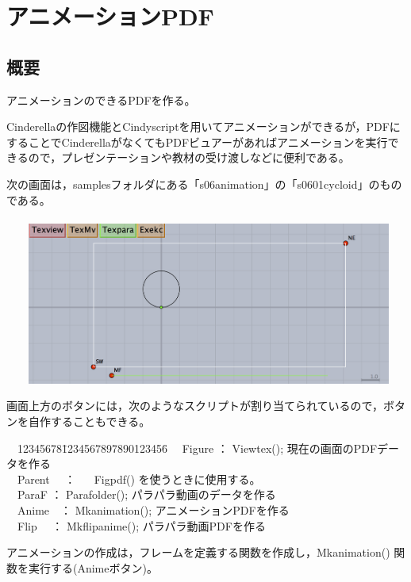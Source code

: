 \documentclass[papersize,a4paper,12pt,uplatex]{jsarticle}
\begin{document}
\section{アニメーションPDF}
\subsection{概要}
アニメーションのできるPDFを作る。

Cinderellaの作図機能とCindyscriptを用いてアニメーションができるが，PDFにすることでCinderellaがなくてもPDFビュアーがあればアニメーションを実行できるので，プレゼンテーションや教材の受け渡しなどに便利である。

次の画面は，samplesフォルダにある「s06animation」の「s0601cycloid」のものである。\\
　\\
　　\includegraphics[bb=0 0 1581 880 , width=12cm]{Figmv/mvgaiyou01.png}

画面上方のボタンには，次のようなスクリプトが割り当てられているので，ボタンを自作することもできる。

\begin{tabbing}
　12345678\=1234567897890123456\=\kill
　Figure  \>： Viewtex(); \>現在の画面のPDFデータを作る\\
　Parent 　\>： 　 \>Figpdf() を使うときに使用する。\\
　ParaF \>： Parafolder(); \>パラパラ動画のデータを作る\\
　Anime　\>： Mkanimation(); \>アニメーションPDFを作る\\
　Flip　 \>： Mkflipanime(); \>パラパラ動画PDFを作る
\end{tabbing}

アニメーションの作成は，フレームを定義する関数を作成し，Mkanimation() 関数を実行する(Animeボタン)。
\end{document}
